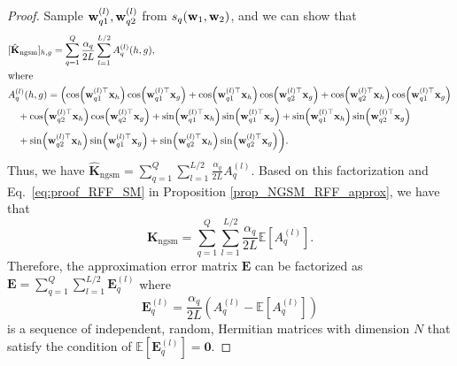 \begin{proof}
Sample \( {\mathbf w}_{q1}^{(l)}, {\mathbf w}_{q2}^{(l)} \) from \(s_q({\mathbf w}_{1}, {\mathbf w}_{2})\),
and we can show that 
\begin{equation}
\begin{aligned}
& [\hat{\mathbf{K}}_{\mathrm{ngsm}}]_{h,g} = \sum_{q=1}^Q \frac{\alpha_q}{2L} \sum_{l=1}^{L/2} A_{q}^{(l)}(h,g), \\
& \text{where} \\
& A_{q}^{(l)}(h,g) = \left( \cos({\mathbf w}_{q1}^{(l)\top} {\mathbf x}_h) \cos({\mathbf w}_{q1}^{(l)\top} {\mathbf x}_g) + \cos({\mathbf w}_{q1}^{(l)\top} {\mathbf x}_h) \cos({\mathbf w}_{q2}^{(l)\top} {\mathbf x}_g) + \cos({\mathbf w}_{q2}^{(l)\top} {\mathbf x}_h) \cos({\mathbf w}_{q1}^{(l)\top} {\mathbf x}_g) \right. \\
& \quad + \cos({\mathbf w}_{q2}^{(l)\top} {\mathbf x}_h) \cos({\mathbf w}_{q2}^{(l)\top} {\mathbf x}_g) + \sin({\mathbf w}_{q1}^{(l)\top} {\mathbf x}_h) \sin({\mathbf w}_{q1}^{(l)\top} {\mathbf x}_g) + \sin({\mathbf w}_{q1}^{(l)\top} {\mathbf x}_h) \sin({\mathbf w}_{q2}^{(l)\top} {\mathbf x}_g) \\
& \quad + \sin({\mathbf w}_{q2}^{(l)\top} {\mathbf x}_h) \sin({\mathbf w}_{q1}^{(l)\top} {\mathbf x}_g) + \sin({\mathbf w}_{q2}^{(l)\top} {\mathbf x}_h) \sin({\mathbf w}_{q2}^{(l)\top} {\mathbf x}_g) \bigg).
\end{aligned}
\end{equation}
Thus, we have $\hat{\mathbf{K}}_{\mathrm{ngsm}} = \sum_{q=1}^Q \sum_{l=1}^{L/2} \frac{\alpha_q}{2L} A_{q}^{(l)}$. Based on this factorization and Eq.~\eqref{eq:proof_RFF_SM} in Proposition \ref{prop_NGSM_RFF_approx}, we have that $${\mathbf{K}}_{\mathrm{ngsm}} = \sum_{q=1}^Q \sum_{l=1}^{L/2} \frac{\alpha_q}{2 L} \mathbb{E}[A_{q}^{(l)}].$$
    Therefore, the approximation error matrix $\mathbf{E}$ can be factorized as
    $
        \mathbf{E} = \sum_{q=1}^Q \sum_{l=1}^{L/2} \mathbf{E}_{q}^{(l)} 
    $
    where 
    \begin{equation}
         \mathbf{E}_{q}^{(l)} = \frac{\alpha_q}{2 L} \left( A_{q}^{(l)} - \mathbb{E}[A_{q}^{(l)}]\right)
    \end{equation}
    is a sequence of independent, random, Hermitian matrices with dimension $N$ that satisfy the condition of $\mathbb{E} [ \mathbf{E}_{q}^{(l)}] = \mathbf{0}$.
    





\end{proof}
